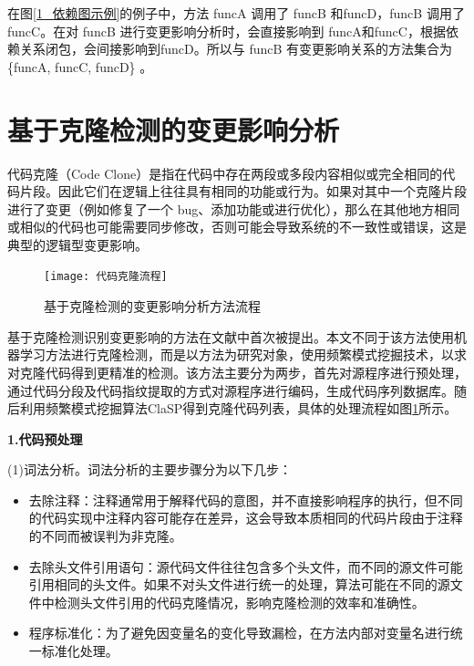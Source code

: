 在图\ref{1_依赖图示例}的例子中，方法 funcA 调用了 funcB 和funcD，funcB 调用了 funcC。在对 funcB 进行变更影响分析时，会直接影响到 funcA和funcC，根据依赖关系闭包，会间接影响到funcD。所以与 funcB 有变更影响关系的方法集合为\{funcA, funcC, funcD\} 。


\section{基于克隆检测的变更影响分析}
代码克隆（Code Clone）是指在代码中存在两段或多段内容相似或完全相同的代码片段。因此它们在逻辑上往往具有相同的功能或行为。如果对其中一个克隆片段进行了变更（例如修复了一个 bug、添加功能或进行优化），那么在其他地方相同或相似的代码也可能需要同步修改，否则可能会导致系统的不一致性或错误，这是典型的逻辑型变更影响。

\begin{figure}[htbp]
\centering
\texttt{[image: 代码克隆流程]}
\caption{基于克隆检测的变更影响分析方法流程}
\label{1_基于代码克隆的变更影响分析方法流程}
\end{figure}

基于克隆检测识别变更影响的方法在文献\cite{daipeng2024software}中首次被提出。本文不同于该方法使用机器学习方法进行克隆检测，而是以方法为研究对象，使用频繁模式挖掘技术，以求对克隆代码得到更精准的检测。该方法主要分为两步，首先对源程序进行预处理，通过代码分段及代码指纹提取的方式对源程序进行编码，生成代码序列数据库。随后利用频繁模式挖掘算法ClaSP得到克隆代码列表，具体的处理流程如图\ref{1_基于代码克隆的变更影响分析方法流程}所示。


\noindent \textbf{1.代码预处理}

(1)词法分析。词法分析的主要步骤分为以下几步：

\begin{itemize}
    \item 去除注释：注释通常用于解释代码的意图，并不直接影响程序的执行，但不同的代码实现中注释内容可能存在差异，这会导致本质相同的代码片段由于注释的不同而被误判为非克隆。
    
    \item 去除头文件引用语句：源代码文件往往包含多个头文件，而不同的源文件可能引用相同的头文件。如果不对头文件进行统一的处理，算法可能在不同的源文件中检测头文件引用的代码克隆情况，影响克隆检测的效率和准确性。
    
    \item 程序标准化：为了避免因变量名的变化导致漏检，在方法内部对变量名进行统一标准化处理。

\end{itemize}


